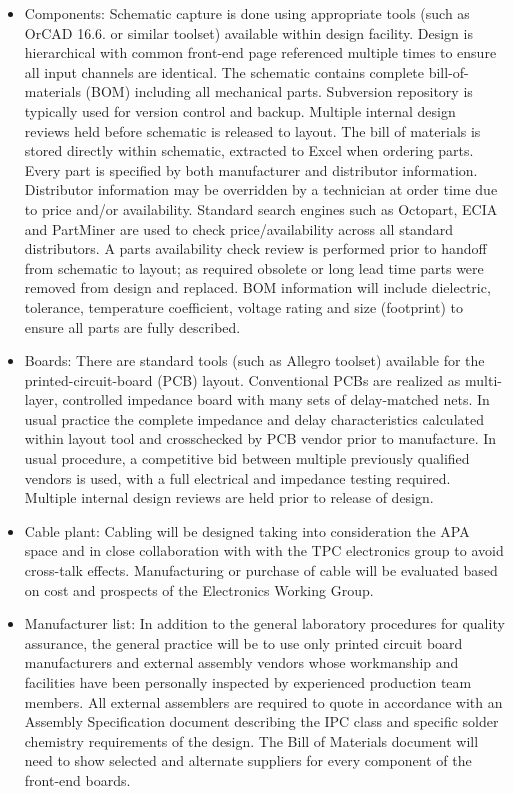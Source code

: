 \begin{itemize}
\item Components: Schematic capture is done using appropriate tools (such as OrCAD 16.6. or similar toolset) available within design facility. Design is hierarchical with common front-end page referenced multiple times to ensure all input channels are identical. The schematic contains complete bill-of-materials (BOM) including all mechanical parts. Subversion repository is typically used for version control and backup. Multiple internal design reviews held before schematic is released to layout. The bill of materials is stored directly within schematic, extracted to Excel when ordering parts. Every part is specified by both manufacturer and distributor information. Distributor information may be overridden by a technician at order time due to price and/or availability. Standard search engines such as Octopart, ECIA and PartMiner are used to check price/availability across all standard distributors. A parts availability check review is performed prior to handoff from schematic to layout; as required obsolete or long lead time parts were removed from design and replaced. BOM information will include dielectric, tolerance, temperature coefficient, voltage rating and size (footprint) to ensure all parts are fully described.
\item Boards:   There are standard tools (such as Allegro toolset) available for the printed-circuit-board (PCB) layout. Conventional PCBs are realized as multi-layer, controlled impedance board with many sets of delay-matched nets. In usual practice the complete impedance and delay characteristics calculated within layout tool and crosschecked by PCB vendor prior to manufacture. In usual procedure, a competitive bid between multiple previously qualified vendors is used, with a full electrical and impedance testing required. Multiple internal design reviews are held prior to release of design.
\item Cable plant: Cabling will be designed taking into  consideration the APA space and in close collaboration with with the TPC electronics group to avoid cross-talk effects.  Manufacturing or purchase of cable will be evaluated based on cost and prospects of the Electronics Working Group.   
\item Manufacturer list: In addition to the general laboratory procedures for quality assurance, the general practice will be to use only printed circuit board manufacturers and external assembly vendors whose workmanship and facilities have been personally inspected by experienced production team members. All external assemblers are required to quote in accordance with an Assembly Specification document describing the IPC class and specific solder chemistry requirements of the design. The Bill of Materials document will need to show selected and alternate suppliers for every component of the front-end boards.
\end{itemize}

